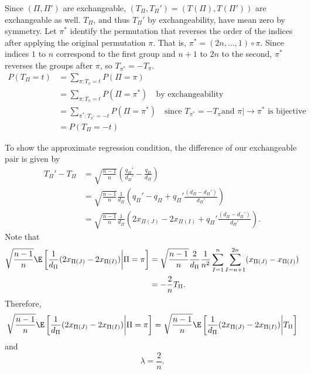 Since $(\Pi, \Pi')$ are exchangeable, $(T_{\Pi}, T_{\Pi}') = (T(\Pi), T(\Pi'))$ are exchangeable as
well.  $T_{\Pi}$, and thus $T_{\Pi}'$ by exchangeability, have mean zero by symmetry.  Let $\pi^*$ identify
the permutation that reverses the order of the indices after applying the original permutation
$\pi$.  That is, $\pi^* = (2n, \ldots, 1) \circ \pi$.  Since indices $1$ to $n$ correspond to the
first group and $n+1$ to $2n$ to the second, $\pi^*$ reverses the groups after $\pi$, so $T_{\pi^*} =
-T_{\pi}$.
\begin{align*}
  P(T_{\Pi} = t) &= \sum_{\pi : T_{\pi} = t} P(\Pi = \pi) \\
  &= \sum_{\pi : T_{\pi} = t} P(\Pi = \pi^*) \quad \text{by exchangeability} \\
  &= \sum_{\pi^* : T_{\pi^*} = -t} P(\Pi = \pi^*) \quad \text{since } T_{\pi^*} = -T_{\pi} \text{
    and } \pi |\!\!\to \pi^* \text{ is bijective} \\
  &= P(T_{\Pi} = -t)
\end{align*}

To show the approximate regression condition, the difference of our exchangeable pair is given by
\begin{align}
  T_{\Pi}' - T_{\Pi}
  &= \sqrt{\frac{n-1}{n}}\left (\frac{q_{\Pi}'}{d_{\Pi}'}-\frac{q_{\Pi}}{d_{\Pi}}\right )
  \nonumber \\
  &= \sqrt{\frac{n-1}{n}}\frac{1}{d_{\Pi}}\left (q_{\Pi}' - q_{\Pi} +
    q_{\Pi}' \frac{(d_{\Pi}-d_{\Pi}')}{d_{\Pi}'}\right ) \nonumber \\
  &= \sqrt{\frac{n-1}{n}}\frac{1}{d_{\Pi}}\left
    (2x_{\Pi(J)} - 2x_{\Pi(I)} + q_{\Pi}' \frac{(d_{\Pi}-d_{\Pi}')}{d_{\Pi}'}\right ). \label{def:ttpcubed}
\end{align}
Note that
\begin{align*}
  \sqrt{\frac{n-1}{n}} \E \left [ \frac{1}{d_{\Pi}} (2x_{\Pi(J)} - 2x_{\Pi(I)}) \middle | \Pi = \pi \right ]
  &= \sqrt{\frac{n-1}{n}} \frac{2}{d_{\Pi}} \frac{1}{n^2} \sum_{I=1}^n \sum_{I=n+1}^{2n} (x_{\Pi(J)}-x_{\Pi(I)}) \\
  &= -\frac{2}{n} T_{\Pi}.
\end{align*}
Therefore,
\begin{equation*}
  \sqrt{\frac{n-1}{n}} \E \left [ \frac{1}{d_{\Pi}} (2x_{\Pi(J)} - 2x_{\Pi(I)}) \middle | \Pi = \pi \right ]
  = \sqrt{\frac{n-1}{n}} \E \left [ \frac{1}{d_{\Pi}} (2x_{\Pi(J)} - 2x_{\Pi(I)}) \middle | T_{\Pi} \right ]
\end{equation*}
and
\begin{equation*}
  \lambda = \frac{2}{n}.
\end{equation*}

